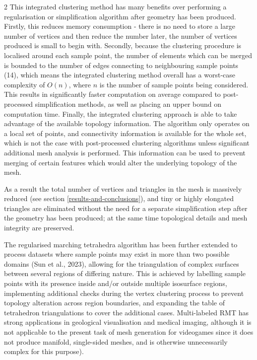 \documentclass[]{article}
\begin{document}
\begin{multicols}{2}
This \textquotesingle integrated\textquotesingle{} clustering method has many benefits over performing a regularisation or simplification algorithm after geometry has been produced. Firstly, this reduces memory consumption - there is no need to store a large number of vertices and then reduce the number later, the number of vertices produced is small to begin with. Secondly, because the clustering procedure is localised around each sample point, the number of elements which can be merged is bounded to the number of edges connecting to neighbouring sample points (14), which means the integrated clustering method overall has a worst-case complexity of $O(n)$, where $n$ is the number of sample points being considered. This results in significantly faster computation on average compared to post-processed simplification methods, as well as placing an upper bound on computation time. Finally, the integrated clustering approach is able to take advantage of the available topology information. The algorithm only operates on a local set of points, and connectivity information is available for the whole set, which is not the case with post-processed clustering algorithms unless significant additional mesh analysis is performed. This information can be used to prevent merging of certain features which would alter the underlying topology of the mesh.

As a result the total number of vertices and triangles in the mesh is massively reduced (see section \ref{results-and-conclusions}), and tiny or highly elongated triangles are eliminated without the need for a separate simplification step after the geometry has been produced; at the same time topological details and mesh integrity are preserved.

The regularised marching tetrahedra algorithm has been further extended to process datasets where sample points may exist in more than two possible domains (Sun et al., 2023), allowing for the triangulation of complex surfaces between several regions of differing nature. This is achieved by labelling sample points with its presence inside and/or outside multiple isosurface regions, implementing additional checks during the vertex clustering process to prevent topology alteration across region boundaries, and expanding the table of tetrahedron triangulations to cover the additional cases. Multi-labeled RMT has strong applications in geological visualisation and medical imaging, although it is not applicable to the present task of mesh generation for videogames since it does not produce manifold, single-sided meshes, and is otherwise unnecessarily complex for this purpose).


\end{multicols}
\end{document}
